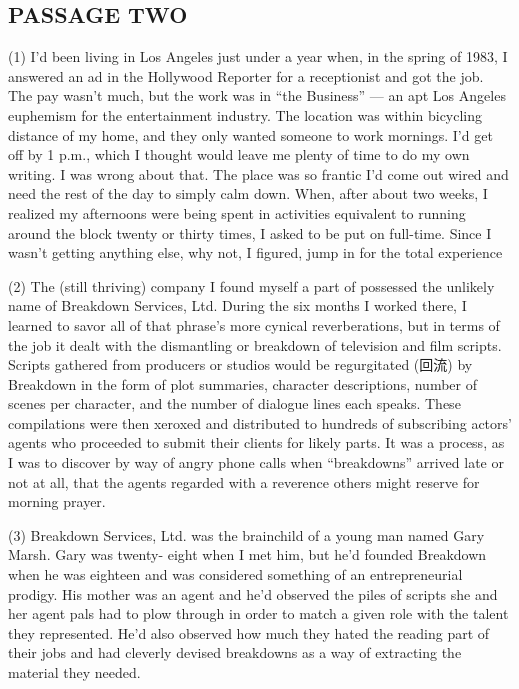 \documentclass[UTF8,11pt]{ctexart}
\begin{document}
\subsection*{\textbf{PASSAGE TWO}}


(1) I’d been living in Los Angeles just under a year when, in the spring of 1983, I answered an ad in the Hollywood Reporter for a receptionist and got the job. The pay wasn’t much, but the work was in “the Business” — an apt Los Angeles euphemism for the entertainment industry. The location was within bicycling distance of my home, and they only wanted someone to work mornings. I’d get off by 1 p.m., which I thought would leave me plenty of time to do my own writing. I was wrong about that. The place was so frantic I’d come out wired and need the rest of the day to simply calm down. When, after about two weeks, I realized my afternoons were being spent in activities equivalent to running around the block twenty or thirty times, I asked to be put on full-time. Since I wasn’t getting anything else, why not, I figured, jump in for the total experience


(2) The (still thriving) company I found myself a part of possessed the unlikely name of Breakdown Services, Ltd. During the six months I worked there, I learned to savor all of that phrase’s more cynical reverberations, but in terms of the job it dealt with the dismantling or breakdown of television and film scripts. Scripts gathered from producers or studios would be regurgitated (回流) by Breakdown in the form of plot summaries, character descriptions, number of scenes per character, and the number of dialogue lines each speaks. These compilations were then xeroxed and distributed to hundreds of subscribing actors’ agents who proceeded to submit their clients for likely parts. It was a process, as I was to discover by way of angry phone calls when “breakdowns” arrived late or not at all, that the agents regarded with a reverence others might reserve for morning prayer.


(3) Breakdown Services, Ltd. was the brainchild of a young man named Gary Marsh. Gary was twenty- eight when I met him, but he’d founded Breakdown when he was eighteen and was considered something of an entrepreneurial prodigy. His mother was an agent and he’d observed the piles of scripts she and her agent pals had to plow through in order to match a given role with the talent they represented. He’d also observed how much they hated the reading part of their jobs and had cleverly devised breakdowns as a way of extracting the material they needed.
\end{document}
